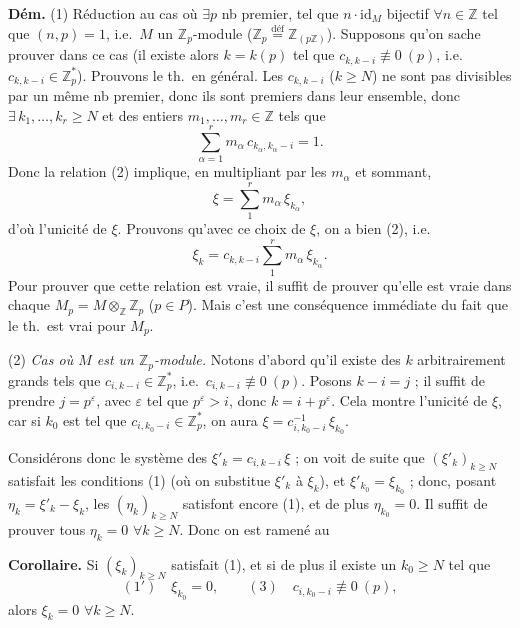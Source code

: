 \documentclass[11pt,a4paper]{article}
\begin{document}
\textbf{Dém.} (1) Réduction au cas où $\exists p$ nb premier, tel que $n \cdot \mathrm{id}_M$
bijectif $\forall n \in \mathbb{Z}$ tel que $(n, p) = 1$, i.e.\ $M$ un $\mathbb{Z}_p$-module
($\mathbb{Z}_p \overset{\text{déf}}{=} \mathbb{Z}_{(p\mathbb{Z})}$). Supposons qu'on sache
prouver dans ce cas \ill{} (il existe alors $k = k(p)$ tel que
$c_{k, k-i} \not\equiv 0 \ (p)$, i.e.\ $c_{k, k-i} \in \mathbb{Z}_p^*$). Prouvons le th.\ en
général. Les $c_{k, k-i}$ ($k \geq N$) ne sont pas divisibles par un même nb
premier, donc ils sont premiers dans leur ensemble, donc $\exists\, k_1, \ldots, k_r \geq N$ et des
entiers $m_1, \ldots, m_r \in \mathbb{Z}$ tels que
\[
  \sum_{\alpha=1}^{r} m_\alpha\, c_{k_\alpha, k_\alpha - i} = 1 .
\]
Donc la relation (2) implique, en multipliant par les $m_\alpha$ et sommant,
\[
  \xi = \sum_{1}^{r} m_\alpha\, \xi_{k_\alpha} ,
\]
d'où l'unicité de $\xi$. Prouvons qu'avec ce choix de $\xi$, on a bien (2), i.e.
\[
  \xi_k = c_{k, k-i} \sum_{1}^{r} m_\alpha\, \xi_{k_\alpha} .
\]
Pour prouver que cette relation est vraie, \struck{\ill{}} il suffit de prouver qu'elle est
vraie dans chaque $M_p = M \otimes_{\mathbb{Z}} \mathbb{Z}_p$ ($p \in P$). Mais c'est une
conséquence immédiate du fait que le th.\ est vrai pour $M_p$.

(2) \emph{Cas où $M$ est un $\mathbb{Z}_p$-module.} Notons d'abord qu'il existe des $k$
arbitrairement grands tels que $c_{i, k-i} \in \mathbb{Z}_p^*$, i.e.\
$c_{i, k-i} \not\equiv 0 \ (p)$. Posons $k - i = j$ ; il suffit de prendre $j = p^\varepsilon$,
avec $\varepsilon$ tel que $p^\varepsilon > i$, donc $k = i + p^\varepsilon$. Cela montre
l'unicité de $\xi$, car si $k_0$ est tel que $c_{i, k_0 - i} \in \mathbb{Z}_p^*$, on aura
\struck{\ill{}} $\xi = c_{i, k_0 - i}^{-1}\, \xi_{k_0}$.

Considérons donc le système des \struck{\ill{}} $\xi'_k = c_{i, k-i}\, \xi$ ; on voit de suite
que \struck{\uncertain{analogue}} $(\xi'_k)_{k \geq N}$ satisfait les conditions (1) (où on
substitue $\xi'_k$ à $\xi_k$), et $\xi'_{k_0} = \xi_{k_0}$ ; donc, posant
$\eta_k = \xi'_k - \xi_k$, les $(\eta_k)_{k \geq N}$ satisfont encore (1), et de plus
$\eta_{k_0} = 0$. Il suffit de prouver tous $\eta_k = 0$ \struck{donc} $\forall k \geq N$.
Donc on est ramené au

\textbf{Corollaire.} Si $(\xi_k)_{k \geq N}$  satisfait (1), et si de plus
\struck{\ill{}} il existe un $k_0 \geq N$ tel que
\[
  (1') \quad \xi_{k_0} = 0 , \qquad (3) \quad c_{i, k_0 - i} \not\equiv 0 \ (p) ,
\]
alors $\xi_k = 0$ $\forall k \geq N$.
\end{document}
